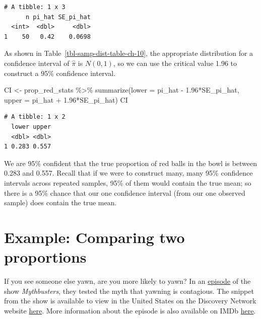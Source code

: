 \documentclass[
  letterpaper,
  DIV=11,
  numbers=noendperiod]{scrreprt}
\newenvironment{Shaded}{\begin{snugshade}}{\end{snugshade}}
\newcommand{\AttributeTok}[1]{\textcolor[rgb]{0.40,0.45,0.13}{#1}}
\newcommand{\FloatTok}[1]{\textcolor[rgb]{0.68,0.00,0.00}{#1}}
\newcommand{\FunctionTok}[1]{\textcolor[rgb]{0.28,0.35,0.67}{#1}}
\newcommand{\NormalTok}[1]{\textcolor[rgb]{0.00,0.23,0.31}{#1}}
\newcommand{\OtherTok}[1]{\textcolor[rgb]{0.00,0.23,0.31}{#1}}
\newcommand{\SpecialCharTok}[1]{\textcolor[rgb]{0.37,0.37,0.37}{#1}}
\theoremstyle{definition}
\theoremstyle{remark}
\begin{document}
\begin{verbatim}
# A tibble: 1 x 3
      n pi_hat SE_pi_hat
  <int>  <dbl>     <dbl>
1    50   0.42    0.0698
\end{verbatim}

As shown in Table~\ref{tbl-samp-dist-table-ch-10}, the appropriate
distribution for a confidence interval of \(\hat{\pi}\) is \(N(0,1)\),
so we can use the critical value 1.96 to construct a 95\% confidence
interval.

\begin{Shaded}
\begin{Highlighting}[]
\NormalTok{CI }\OtherTok{\textless{}{-}}\NormalTok{ prop\_red\_stats }\SpecialCharTok{\%\textgreater{}\%} 
  \FunctionTok{summarize}\NormalTok{(}\AttributeTok{lower =}\NormalTok{ pi\_hat }\SpecialCharTok{{-}} \FloatTok{1.96}\SpecialCharTok{*}\NormalTok{SE\_pi\_hat,}
            \AttributeTok{upper =}\NormalTok{ pi\_hat }\SpecialCharTok{+} \FloatTok{1.96}\SpecialCharTok{*}\NormalTok{SE\_pi\_hat)}
\NormalTok{CI}
\end{Highlighting}
\end{Shaded}

\begin{verbatim}
# A tibble: 1 x 2
  lower upper
  <dbl> <dbl>
1 0.283 0.557
\end{verbatim}

We are 95\% confident that the true proportion of red balls in the bowl
is between 0.283 and 0.557. Recall that if we were to construct many,
many 95\% confidence intervals across repeated samples, 95\% of them
would contain the true mean; so there is a 95\% chance that our one
confidence interval (from our one observed sample) does contain the true
mean.

\hypertarget{example-comparing-two-proportions}{%
\section{Example: Comparing two
proportions}\label{example-comparing-two-proportions}}

If you see someone else yawn, are you more likely to yawn? In an
\href{http://www.discovery.com/tv-shows/mythbusters/mythbusters-database/yawning-contagious/}{episode}
of the show \emph{Mythbusters}, they tested the myth that yawning is
contagious. The snippet from the show is available to view in the United
States on the Discovery Network website
\href{https://www.discovery.com/tv-shows/mythbusters/videos/is-yawning-contagious}{here}.
More information about the episode is also available on IMDb
\href{https://www.imdb.com/title/tt0768479/}{here}.
\end{document}
